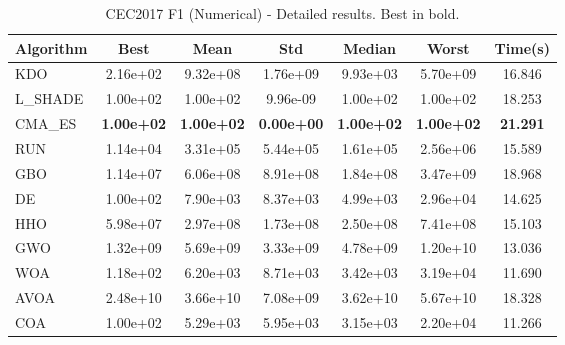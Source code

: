 \begin{table}[H]
\centering\small
\caption{CEC2017 F1 (Numerical) - Detailed results. Best in bold.}
\label{tab:cec2017_F1}
\begin{tabular}{lcccccc}
\toprule
\textbf{Algorithm} & \textbf{Best} & \textbf{Mean} & \textbf{Std} & \textbf{Median} & \textbf{Worst} & \textbf{Time(s)} \\
\midrule
KDO & 2.16e+02 & 9.32e+08 & 1.76e+09 & 9.93e+03 & 5.70e+09 & 16.846 \\
L_SHADE & 1.00e+02 & 1.00e+02 & 9.96e-09 & 1.00e+02 & 1.00e+02 & 18.253 \\
CMA_ES & \textbf{1.00e+02} & \textbf{1.00e+02} & \textbf{0.00e+00} & \textbf{1.00e+02} & \textbf{1.00e+02} & \textbf{21.291} \\
RUN & 1.14e+04 & 3.31e+05 & 5.44e+05 & 1.61e+05 & 2.56e+06 & 15.589 \\
GBO & 1.14e+07 & 6.06e+08 & 8.91e+08 & 1.84e+08 & 3.47e+09 & 18.968 \\
DE & 1.00e+02 & 7.90e+03 & 8.37e+03 & 4.99e+03 & 2.96e+04 & 14.625 \\
HHO & 5.98e+07 & 2.97e+08 & 1.73e+08 & 2.50e+08 & 7.41e+08 & 15.103 \\
GWO & 1.32e+09 & 5.69e+09 & 3.33e+09 & 4.78e+09 & 1.20e+10 & 13.036 \\
WOA & 1.18e+02 & 6.20e+03 & 8.71e+03 & 3.42e+03 & 3.19e+04 & 11.690 \\
AVOA & 2.48e+10 & 3.66e+10 & 7.08e+09 & 3.62e+10 & 5.67e+10 & 18.328 \\
COA & 1.00e+02 & 5.29e+03 & 5.95e+03 & 3.15e+03 & 2.20e+04 & 11.266 \\
\bottomrule
\end{tabular}
\end{table}
